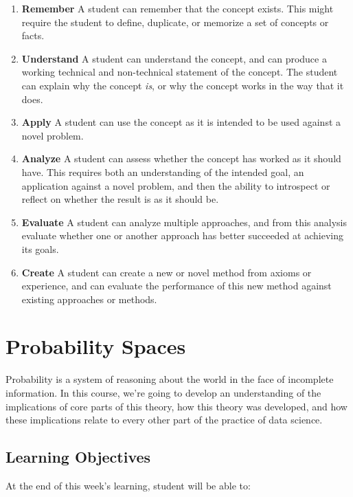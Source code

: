 \documentclass[
]{book}
\providecommand{\tightlist}{%
  \setlength{\itemsep}{0pt}\setlength{\parskip}{0pt}}
\theoremstyle{definition}
\theoremstyle{definition}
\theoremstyle{definition}
\theoremstyle{definition}
\theoremstyle{remark}
\begin{document}
\begin{enumerate}
\def\labelenumi{\arabic{enumi}.}
\tightlist
\item
  \textbf{Remember} A student can remember that the concept exists. This might require the student to define, duplicate, or memorize a set of concepts or facts.
\item
  \textbf{Understand} A student can understand the concept, and can produce a working technical and non-technical statement of the concept. The student can explain why the concept \emph{is}, or why the concept works in the way that it does.
\item
  \textbf{Apply} A student can use the concept as it is intended to be used against a novel problem.
\item
  \textbf{Analyze} A student can assess whether the concept has worked as it should have. This requires both an understanding of the intended goal, an application against a novel problem, and then the ability to introspect or reflect on whether the result is as it should be.
\item
  \textbf{Evaluate} A student can analyze multiple approaches, and from this analysis evaluate whether one or another approach has better succeeded at achieving its goals.
\item
  \textbf{Create} A student can create a new or novel method from axioms or experience, and can evaluate the performance of this new method against existing approaches or methods.
\end{enumerate}

\hypertarget{probability-spaces}{%
\chapter{Probability Spaces}\label{probability-spaces}}

Probability is a system of reasoning about the world in the face of incomplete information. In this course, we're going to develop an understanding of the implications of core parts of this theory, how this theory was developed, and how these implications relate to every other part of the practice of data science.

\hypertarget{learning-objectives}{%
\section{Learning Objectives}\label{learning-objectives}}

At the end of this week's learning, student will be able to:
\end{document}
